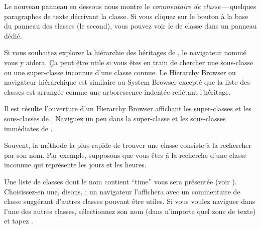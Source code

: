 \documentclass[a4paper,10pt,twoside]{book}
\begin{document}
Le nouveau panneau en dessous nous montre le \emph{commentaire de
  classe}\,---\,quelques paragraphes de texte d\'ecrivant la classe.
Si vous cliquez sur le bouton  \`a la base du panneau des
classes 
(\cad le second),
vous pouvez voir le  de classe dans un
panneau d\'edi\'e.


Si vous souhaitez explorer la hi\'erarchie des h\'eritages de \sq, le
navigateur nomm\'e  vous y aidera.
Ça peut \^etre utile si vous \^etes en train de chercher une
sous-classe ou une super-classe inconnue d'une classe connue.
Le Hierarchy Browser ou navigateur hi\'erarchique est similaire au System Browser except\'e que la liste des classes est arrang\'ee comme
une arborescence indent\'ee refl\'etant l'h\'eritage.

\noindent
Il est r\'esulte l'ouverture d'un Hierarchy Browser affichant les
super-classes et les sous-classes de .
Naviguez un peu dans la super-classe et les sous-classes imm\'ediates
de .

Souvent, la m\'ethode la plus rapide de trouver une classe consiste
\`a la rechercher par son nom. Par exemple, supposons que vous \^etes
\`a la recherche d'une classe inconnue qui repr\'esente les jours et
les heures.%

\noindent
Une liste de classes dont le nom contient ``time'' vous sera
pr\'esent\'ee (voir ). Choisissez-en une, disons,
; 
un navigateur l'affichera avec un commentaire de classe
sugg\'erant d'autres classes pouvant \^etre utiles. Si vous voulez
naviguer dans l'une des autres classes, s\'electionnez son nom (dans
n'importe quel zone de texte) et tapez .
\end{document}
